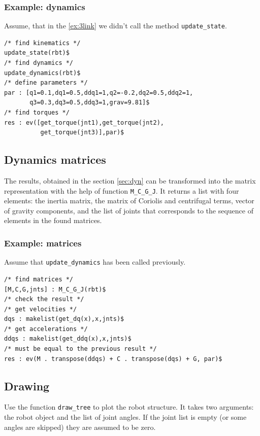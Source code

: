 \documentclass{article}
\begin{document}
\subsubsection{Example: dynamics} 

Assume, that in the \ref{ex:3link} we didn't call the method \texttt{update\_state}. 
\begin{verbatim}
/* find kinematics */
update_state(rbt)$
/* find dynamics */
update_dynamics(rbt)$
/* define parameters */
par : [q1=0.1,dq1=0.5,ddq1=1,q2=-0.2,dq2=0.5,ddq2=1,
       q3=0.3,dq3=0.5,ddq3=1,grav=9.81]$
/* find torques */
res : ev([get_torque(jnt1),get_torque(jnt2),
          get_torque(jnt3)],par)$
\end{verbatim}

\subsection{Dynamics matrices} 

The results, obtained in the section \ref{sec:dyn} can be transformed into the matrix representation with the help of function \texttt{M\_C\_G\_J}. It returns a list with four elements: the inertia matrix, the matrix of Coriolis and centrifugal terms, vector of gravity components, and the list of joints that corresponds to the sequence of elements in the found matrices. 

\subsubsection{Example: matrices} 

Assume that \texttt{update\_dynamics} has been called previously.
\begin{verbatim}
/* find matrices */
[M,C,G,jnts] : M_C_G_J(rbt)$
/* check the result */
/* get velocities */
dqs : makelist(get_dq(x),x,jnts)$
/* get accelerations */
ddqs : makelist(get_ddq(x),x,jnts)$
/* must be equal to the previous result */
res : ev(M . transpose(ddqs) + C . transpose(dqs) + G, par)$
\end{verbatim}

\subsection{Drawing}

Use the function \texttt{draw\_tree} to plot the robot structure. It takes two arguments: the robot object and the list of joint angles. If the joint list is empty (or some angles are skipped) they are assumed to be zero. 
\end{document}
